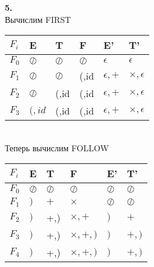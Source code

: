\documentclass[a4paper,12pt]{article}
\begin{document}
\textbf{5.}\\
Вычислим FIRST\\
\begin{tabular}{ || l | l | l | l | l | l || }
\hline
$F_i$ &E & T & F & E' & T'  \\ \hline
$F_0$ &$\oslash$ & $\oslash$ & $\oslash$ & $\epsilon$ & $\epsilon$  \\ \hline
$F_1$ &$\oslash$ & $\oslash$ & (,id & $\epsilon,+$ & $\times, \epsilon$  \\ \hline
$F_2$ &$\oslash$ & (,id & (,id & $\epsilon,+$ &   $\times, \epsilon$ \\ \hline
$F_3$ &$(,id$ & (,id & (,id & $\epsilon,+$ &   $\times, \epsilon$ \\ \hline
\hline
\end{tabular}
\\
Теперь вычислим FOLLOW\\
\begin{tabular}{ || l | l | l | l | l | l || }
\hline
$F_i$ &E & T & F & E' & T'  \\ \hline
$F_0$ &$\oslash$ & $\oslash$ & $\oslash$ & $\oslash$ & $\oslash$  \\ \hline
$F_1$ &$)$ & $+$ &$\times$ & $\oslash$ & $\oslash$  \\ \hline
$F_2$ &$)$ & +,) & $\times,+$ & $)$ &   $+$ \\ \hline
$F_3$ &$)$ & +,) & $\times,+,)$ & $)$ &   $+,)$ \\ \hline
$F_4$ &$)$ & +,) & $\times,+,)$ & $)$ &   $+,)$ \\ \hline
\hline
\end{tabular}
\end{document}
